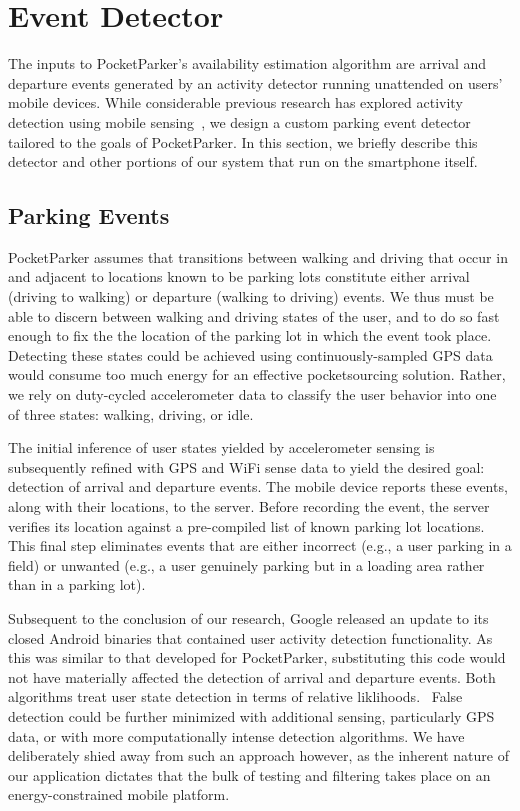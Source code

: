 \section{Event Detector}
\label{sec-detector}

The inputs to PocketParker's availability estimation algorithm are arrival and
departure events generated by an activity detector running unattended on users'
mobile devices.  While considerable previous research has explored activity
detection using mobile sensing~\cite{Constandache:2010:DYS, Keally:2011:PTP,
Reddy:2010:UMP, Yang:2011:DDP, Wang:2009:FEE}, we design a custom parking event
detector tailored to the goals of PocketParker.  In this section, we briefly
describe this detector and other portions of our system that run on the
smartphone itself.  

\subsection{Parking Events}
\label{subsec-goals}

PocketParker assumes that transitions between walking and driving that occur
in and adjacent to locations known to be parking lots constitute either
arrival (driving to walking) or departure (walking to driving) events.  We thus
must be able to discern between walking and driving states of the user, and to 
do so fast enough to fix the the location of the parking lot in which the
event took place.  Detecting these states could be achieved using
continuously-sampled GPS data would consume too much energy for an effective
pocketsourcing solution.  Rather, we rely on duty-cycled accelerometer data to
classify the user behavior into one of three states: walking, driving, or idle.

The initial inference of user states yielded by accelerometer sensing is
subsequently refined with GPS and WiFi sense data to yield the desired goal:
detection of arrival and departure events.  The mobile device reports these
events, along with their locations, to the server.  Before recording the event,
the server verifies its location against a pre-compiled list of known parking
lot locations.  This final step eliminates events that are either
incorrect (e.g., a user parking in a field) or unwanted (e.g., a user genuinely
parking but in a loading area rather than in a parking lot).

Subsequent to the conclusion of our research, Google released an update to its
closed Android binaries that contained user activity detection functionality.
As this was similar to that developed for PocketParker, substituting this
code would not have materially affected the detection of arrival and departure 
events.  Both algorithms treat user state detection in terms of relative
liklihoods.~\cite{recognition-confidence}  False detection could be further 
minimized with additional sensing, particularly GPS data, or with more 
computationally intense detection algorithms.  We have deliberately shied away 
from such an approach however, as the inherent nature of our application 
dictates that the bulk of testing and filtering takes place on an 
energy-constrained mobile platform.
